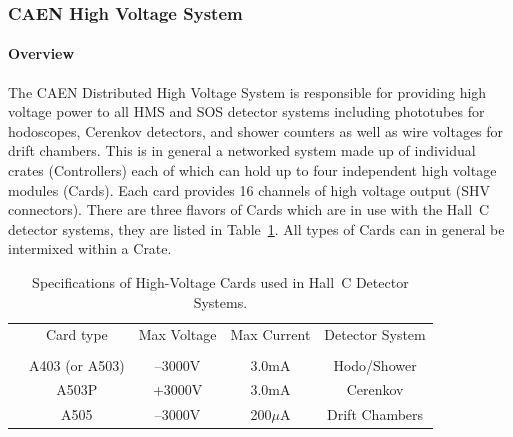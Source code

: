 %
%
%
%
%
%
%
%
%
%
\subsubsection{CAEN High Voltage System}

\paragraph{Overview}

The CAEN Distributed High Voltage System is responsible for
providing high voltage power to all HMS and SOS detector systems
including phototubes for hodoscopes, Cerenkov detectors, and shower
counters as well as wire voltages for drift chambers.  This is in
general a networked system made up of individual crates (Controllers)
each of which can hold up to four independent high voltage modules
(Cards).  Each card provides 16 channels of high voltage output (SHV
connectors).  There are three flavors of Cards which are in use with the
Hall~C detector systems, they are listed in Table~\ref{tab:hv_cards}.  All types of Cards 
can in general be intermixed within a Crate.


\begin{table}
\caption{Specifications of High-Voltage Cards used in Hall~C Detector 
Systems\label{tab:hv_cards}.}
\begin{center}
\begin{tabular}{ccccc}
        &Card type      &Max Voltage    &Max Current    &Detector System \\
	&		&		&		&	\\
	& A403 (or A503)&--3000V		&3.0mA		&Hodo/Shower\\
	& A503P		&+3000V		&3.0mA		&Cerenkov\\
	& A505		&--3000V		&200$\mu$A 	&Drift Chambers\\
  \end{tabular}
\end{center}
\end{table}


